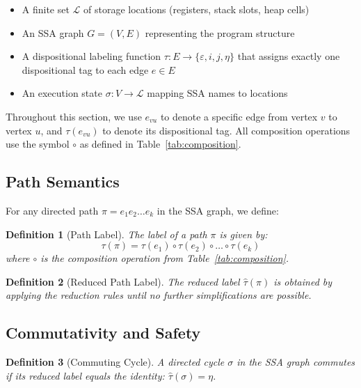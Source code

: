 \documentclass[journal]{IEEEtran}
\newtheorem{definition}{Definition}
\begin{document}
\begin{itemize}
\item A finite set $\mathcal{L}$ of storage locations (registers, stack slots, heap cells)
\item An SSA graph $G = (V, E)$ representing the program structure  
\item A dispositional labeling function $\tau: E \to \{\varepsilon, i, j, \eta\}$ that assigns exactly one dispositional tag to each edge $e \in E$
\item An execution state $\sigma: V \to \mathcal{L}$ mapping SSA names to locations
\end{itemize}

Throughout this section, we use $e_{vu}$ to denote a specific edge from vertex $v$ to vertex $u$, and $\tau(e_{vu})$ to denote its dispositional tag. All composition operations use the symbol $\circ$ as defined in Table~\ref{tab:composition}.

\subsection{Path Semantics}

For any directed path $\pi = e_1 e_2 \ldots e_k$ in the SSA graph, we define:

\begin{definition}[Path Label]
The label of a path $\pi$ is given by:
\begin{equation}
\tau(\pi) = \tau(e_1) \circ \tau(e_2) \circ \ldots \circ \tau(e_k)
\end{equation}
where $\circ$ is the composition operation from Table~\ref{tab:composition}.
\end{definition}

\begin{definition}[Reduced Path Label]  
The reduced label $\hat{\tau}(\pi)$ is obtained by applying the reduction rules until no further simplifications are possible.
\end{definition}

\subsection{Commutativity and Safety}

\begin{definition}[Commuting Cycle]
A directed cycle $\sigma$ in the SSA graph commutes if its reduced label equals the identity: $\hat{\tau}(\sigma) = \eta$.
\end{definition}
\end{document}
